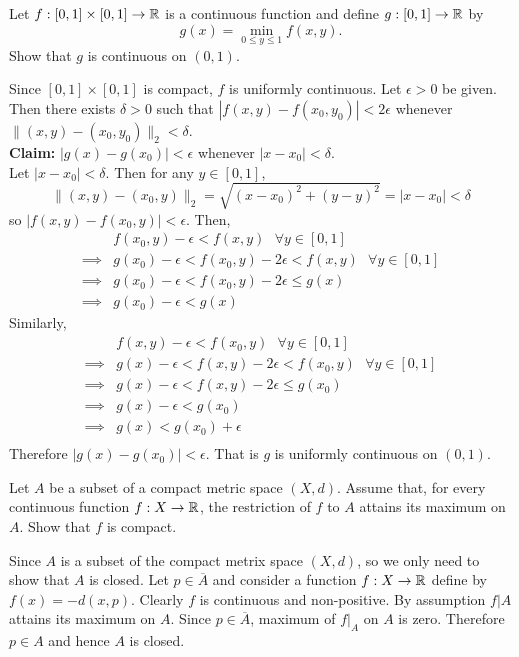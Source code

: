 \question Let $f:[0,1]\times[0,1]\to\mathbb{R}$ is a continuous function and define $g:[0,1]\to\mathbb{R}$ by
$$g(x)=\min_{0\leq y\leq1}{f(x,y)}.$$
Show that $g$ is continuous on $(0,1)$.
\begin{solution}
    Since $[0,1]\times[0,1]$ is compact, $f$ is uniformly continuous. Let $\epsilon>0$ be given. Then there exists $\delta>0$ such that $|f(x,y)-f(x_0,y_0)|<2\epsilon$ whenever $\|(x,y)-(x_0,y_0)\|_2<\delta$.\\
    \textbf{Claim:} $|g(x)-g(x_0)|<\epsilon$ whenever $|x-x_0|<\delta$.\\
    Let $|x-x_0|<\delta$. Then for any $y\in[0,1]$,
    $$\|(x,y)-(x_0,y)\|_2=\sqrt{(x-x_0)^2+(y-y)^2}=|x-x_0|<\delta$$
    so $|f(x,y)-f(x_0,y)|<\epsilon$. Then,
    \begin{align*}
        &f(x_0,y)-\epsilon<f(x,y)\,\,\,\,\forall y\in[0,1]\\
        \implies &g(x_0)-\epsilon<f(x_0,y)-2\epsilon<f(x,y)\,\,\,\,\forall y\in[0,1]\\
        \implies &g(x_0)-\epsilon<f(x_0,y)-2\epsilon\leq g(x)\\
        \implies &g(x_0)-\epsilon< g(x)
    \end{align*}
    Similarly,
    \begin{align*}
        &f(x,y)-\epsilon<f(x_0,y)\,\,\,\,\forall y\in[0,1]\\
        \implies &g(x)-\epsilon<f(x,y)-2\epsilon<f(x_0,y)\,\,\,\,\forall y\in[0,1]\\
        \implies &g(x)-\epsilon<f(x,y)-2\epsilon\leq g(x_0)\\
        \implies &g(x)-\epsilon< g(x_0)\\
        \implies &g(x)< g(x_0)+\epsilon\\
    \end{align*}
    Therefore $|g(x)-g(x_0)|<\epsilon$. That is $g$ is uniformly continuous on $(0,1)$.
\end{solution}

\question Let $A$ be a subset of a compact metric space $(X, d)$. Assume that, for every continuous function $f:X\to\mathbb{R}$, the restriction of $f$ to $A$ attains its maximum on $A$. Show that $f$ is compact.
\begin{solution}
    Since $A$ is a subset of the compact metrix space $(X,d)$, so we only need to show that $A$ is closed. Let $p\in\overline{A}$ and consider a function $f:X\to\mathbb{R}$ define by $f(x)=-d(x,p)$. Clearly $f$ is continuous and non-positive. By assumption $f|A$ attains its maximum on $A$. Since $p\in\overline{A}$, maximum of $f|_A$ on $A$ is zero. Therefore $p\in A$ and hence $A$ is closed.
\end{solution}

